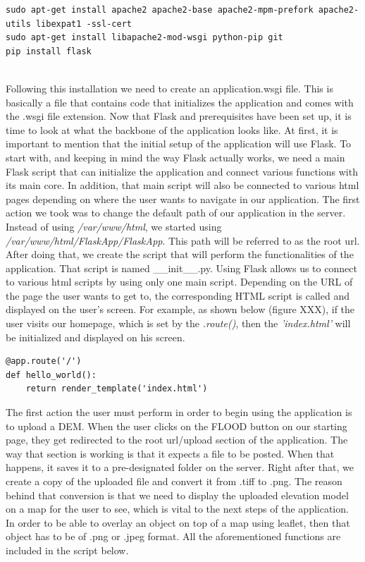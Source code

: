 \begin{lstlisting}
sudo apt-get install apache2 apache2-base apache2-mpm-prefork apache2-utils libexpat1 -ssl-cert
sudo apt-get install libapache2-mod-wsgi python-pip git
pip install flask
\end{lstlisting}\\

Following this installation we need to create an application.wsgi file. This is basically a file that contains code that initializes the application and comes with the .wsgi file extension. 
Now that Flask and prerequisites have been set up, it is time to look at what the backbone of the application looks like. At first, it is important to mention that the initial setup of the application will use Flask. To start with, and keeping in mind the way Flask actually works, we need a main Flask script that can initialize the application and connect various functions with its main core. In addition, that main script will also be connected to various html pages depending on where the user wants to navigate in our application.
The first action we took was to change the default path of our application in the server. Instead of using \textit{/var/www/html}, we started using \textit{/var/www/html/FlaskApp/FlaskApp}. This path will be referred to as the root url. After doing that, we create the script that will perform the functionalities of the application. That script is named \_\_init\_\_.py. Using Flask allows us to connect to various html scripts by using  only one main script. Depending on the URL of the page the user wants to get to, the corresponding HTML script is called and displayed on the user's screen. For example, as shown below (figure XXX), if the user visits our homepage, which is set by the \textit{\@app.route()}, then the \textit{'index.html'} will be initialized and displayed on his screen.\\

\begin{lstlisting}
@app.route('/')
def hello_world():
	return render_template('index.html')
\end{lstlisting}

The first action the user must perform in order to begin using the application is to upload a DEM. When the user clicks on the FLOOD button on our starting page, they get redirected to the root url/upload  section of the application. The way that section is working is that it expects a file to be posted. When that happens, it saves it to a pre-designated folder on the server. Right after that, we create a copy of the uploaded file and convert it from .tiff to .png. The reason behind that conversion is that we need to display the uploaded elevation model on a map for the user to see, which is vital to the next steps of the application. In order to be able to overlay an object on top of a map using leaflet, then that object has to be of .png or .jpeg format. All the aforementioned functions are included in the script below.\\

